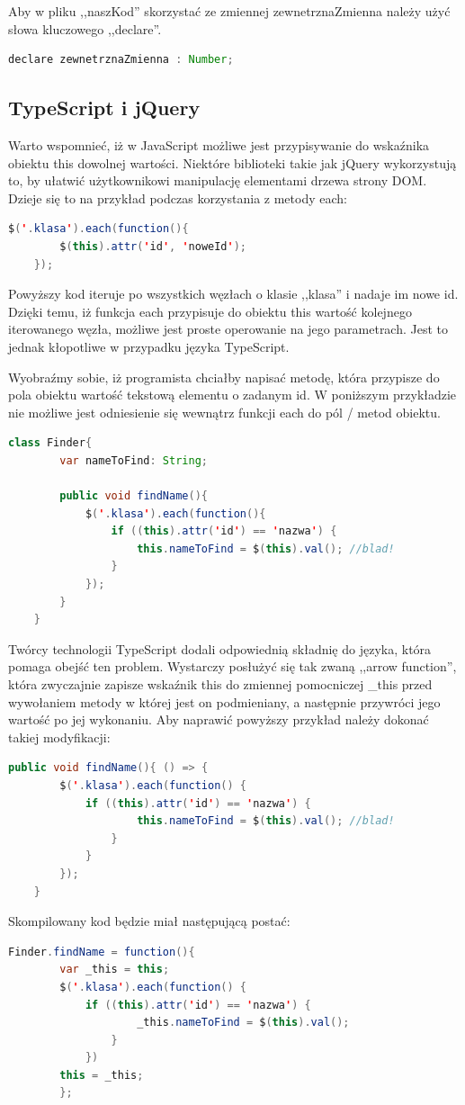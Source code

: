 Aby w pliku ,,naszKod'' skorzystać ze zmiennej zewnetrznaZmienna należy użyć słowa kluczowego ,,declare''.
\begin{lstlisting}[language=Java]
	declare zewnetrznaZmienna : Number;
\end{lstlisting}

\subsection{TypeScript i jQuery}
Warto wspomnieć, iż w JavaScript możliwe jest przypisywanie do wskaźnika obiektu this dowolnej wartości. Niektóre biblioteki takie jak jQuery wykorzystują to, by ułatwić użytkownikowi manipulację elementami drzewa strony DOM. Dzieje się to na przykład podczas korzystania z metody each:

\begin{lstlisting}[language=Java]
	$('.klasa').each(function(){
		$(this).attr('id', 'noweId');
	});
\end{lstlisting}
Powyższy kod iteruje po wszystkich węzłach o klasie ,,klasa'' i nadaje im nowe id. Dzięki temu, iż funkcja each przypisuje do obiektu this wartość kolejnego iterowanego węzła, możliwe jest proste operowanie na jego parametrach. Jest to jednak kłopotliwe w przypadku języka TypeScript.

Wyobraźmy sobie, iż programista chciałby napisać metodę, która przypisze do pola obiektu wartość tekstową elementu o zadanym id. W poniższym przykładzie nie możliwe jest odniesienie się wewnątrz funkcji each do pól / metod obiektu.
\begin{lstlisting}[language=Java]
	class Finder{
		var nameToFind: String;
	
		public void findName(){
			$('.klasa').each(function(){
				if ((this).attr('id') == 'nazwa') {
					this.nameToFind = $(this).val(); //blad!
				}
			});
		}
	}
\end{lstlisting}

Twórcy technologii TypeScript dodali odpowiednią składnię do języka, która pomaga obejść ten problem. Wystarczy posłużyć się tak zwaną ,,arrow function'', która zwyczajnie zapisze wskaźnik this do zmiennej pomocniczej \_this przed wywołaniem metody w której jest on podmieniany, a następnie przywróci jego wartość po jej wykonaniu. Aby naprawić powyższy przykład należy dokonać takiej modyfikacji:

\begin{lstlisting}[language=Java]
	public void findName(){ () => {
		$('.klasa').each(function() {
			if ((this).attr('id') == 'nazwa') { 
					this.nameToFind = $(this).val(); //blad!
				}
			}
		});
	}
\end{lstlisting}

Skompilowany kod będzie miał następującą postać:
\begin{lstlisting}[language=Java]
	Finder.findName = function(){ 
		var _this = this;
		$('.klasa').each(function() {
			if ((this).attr('id') == 'nazwa') { 
					_this.nameToFind = $(this).val();
				}
			})
		this = _this;
		};
\end{lstlisting}
